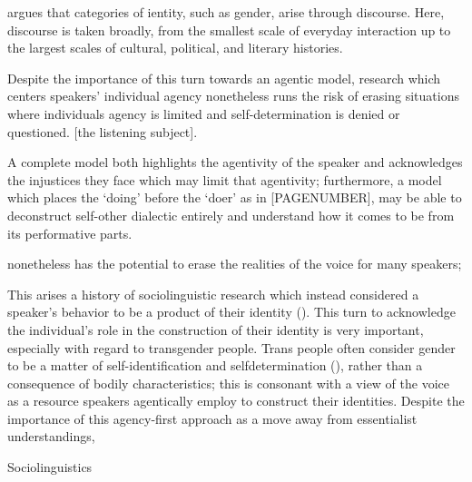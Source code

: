 \textcite{silverstein_langauge_2023} argues that categories of ientity, such as gender, arise through discourse. Here, discourse is taken broadly, from the smallest scale of everyday interaction up to the largest scales of cultural, political, and literary histories.



Despite the importance of this turn towards an agentic model, research which centers speakers' individual agency nonetheless runs the risk of erasing situations where individuals agency is limited and self-determination is denied or questioned. [the listening subject].


A complete model both highlights the agentivity of the speaker and acknowledges the injustices they face which may limit that agentivity; furthermore, a model which places the `doing' before the `doer' as in \textcite{butler_gender_1990} [PAGENUMBER], may be able to deconstruct self-other dialectic entirely and understand how it comes to be from its performative parts.

 nonetheless has the potential to erase the realities of the voice for many speakers; 


This arises  a history of sociolinguistic research which instead considered a speaker's behavior to be a product of their identity (\cite{eckert_three_2012}). This turn to acknowledge the individual's role in the construction of their identity is very important, especially with regard to transgender people. Trans people often consider gender to be a matter of self-identification and selfdetermination (\cite{zimman_linguistic_2017}), rather than a consequence of bodily characteristics; this is consonant with a view of the voice as a resource speakers agentically employ to construct their identities. Despite the importance of this agency-first approach as a move away from essentialist understandings, 




Sociolinguistics




